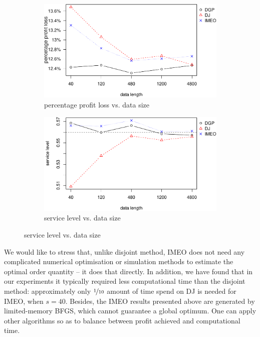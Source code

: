 \documentclass[a4paper,11pt]{article}
\begin{document}
\begin{figure}[ht]
\centering
\caption{Performance vs. sample size with nonlinear profit function}
\begin{subfigure}[b]{0.48\textwidth}
\centering
\includegraphics[width=\textwidth]{nonlinearppl.pdf}
\caption{percentage profit loss vs. data size}
\end{subfigure}
\hfill
\begin{subfigure}[b]{0.48\textwidth}
\centering
\includegraphics[width=\textwidth]{nonlinearsl.pdf}
\caption{service level vs. data size}
\end{subfigure}
\label{fig:non}
\end{figure}

We would like to stress that, unlike disjoint method, IMEO does not need any complicated numerical optimisation or simulation methods to estimate the optimal order quantity -- it does that directly. In addition, we have found that in our experiments it typically required less computational time than the disjoint method: approximately only $\nicefrac{1}{10}$ amount of time spend on DJ is needed for IMEO, when $s=40$. Besides, the IMEO results presented above are generated by limited-memory BFGS, which cannot guarantee a global optimum. One can apply other algorithms so as to balance between profit achieved and computational time.
\end{document}
